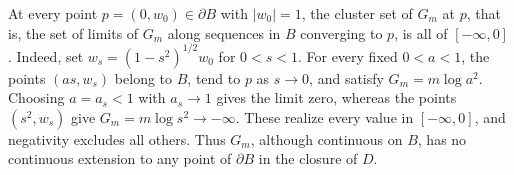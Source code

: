 \begin{example}\label{ex:ball-green-boundary-clusters}
At every point $p=(0,w_0)\in\partial B$ with $|w_0|=1$, the cluster set of $G_m$ at $p$, that is, the set of limits of $G_m$ along sequences in $B$ converging to $p$, is all of $[-\infty,0]$. Indeed, set $w_s=(1-s^2)^{1/2}w_0$ for $0<s<1$. For every fixed $0<a<1$, the points $(as,w_s)$ belong to $B$, tend to $p$ as $s\to0$, and satisfy $G_m=m\log a^2$. Choosing $a=a_s<1$ with $a_s\to1$ gives the limit zero, whereas the points $(s^2,w_s)$ give $G_m=m\log s^2\to-\infty$. These realize every value in $[-\infty,0]$, and negativity excludes all others. Thus $G_m$, although continuous on $B$, has no continuous extension to any point of $\partial B$ in the closure of $D$.
\end{example}
